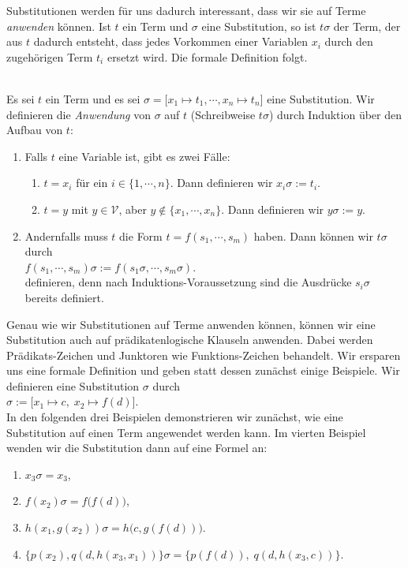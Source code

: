 \noindent
Substitutionen werden f\"{u}r uns dadurch interessant, dass wir sie auf Terme {\emph{\color{blue}anwenden}}
k\"{o}nnen.  Ist $t$ ein Term und  
$\sigma$ eine Substitution, so ist $t\sigma$ der Term, der aus $t$ dadurch entsteht, dass jedes Vorkommen einer Variablen
$x_i$ durch den zugeh\"{o}rigen Term $t_i$ ersetzt wird.  Die formale Definition folgt. 
\begin{Definition}
\hspace*{\fill} \\
Es sei $t$ ein Term und es sei $\sigma = \bigl[ x_1 \mapsto t_1, \cdots, x_n \mapsto t_n \bigr]$
eine Substitution. Wir definieren die \emph{Anwendung} von $\sigma$ auf $t$ (Schreibweise $t\sigma$) durch Induktion \"{u}ber
den Aufbau von $t$: 
\begin{enumerate}
\item Falls $t$ eine Variable ist, gibt es zwei F\"{a}lle:
  \begin{enumerate}
  \item $t = x_i$ f\"{u}r ein $i\in\{1,\cdots,n\}$.  Dann definieren wir \quad  $x_i\sigma := t_i$.
  \item $t = y$ mit $y\in\mathcal{V}$, aber $y \not\in \{x_1,\cdots,x_n\}$. Dann definieren wir \quad $y\sigma := y$.
  \end{enumerate}
\item Andernfalls muss $t$ die Form $t= f(s_1,\cdots,s_m)$ haben. Dann k\"{o}nnen wir $t\sigma$ durch \\[0.2cm]
      \hspace*{1.3cm} $f(s_1, \cdots, s_m)\sigma := f(s_1\sigma, \cdots, s_m\sigma)$. \\[0.2cm]
      definieren, denn nach Induktions-Voraussetzung sind die Ausdr\"{u}cke $s_i\sigma$ bereits definiert.      
      \eox
\end{enumerate}
\end{Definition}

Genau wie wir Substitutionen auf Terme anwenden k\"{o}nnen, k\"{o}nnen wir eine Substitution
auch auf pr\"{a}dikatenlogische Klauseln anwenden.  Dabei werden Pr\"{a}dikats-Zeichen und
Junktoren wie Funktions-Zeichen behandelt.
Wir ersparen uns eine formale Definition und geben statt dessen zun\"{a}chst einige Beispiele. 
Wir definieren eine Substitution $\sigma$ durch \\[0.2cm]
\hspace*{1.3cm} $\sigma := \big[ x_1 \mapsto c,\; x_2 \mapsto f(d) \big]$. \\[0.2cm]
In den folgenden drei Beispielen demonstrieren wir zun\"{a}chst, wie eine Substitution
auf einen Term angewendet werden kann.  Im vierten Beispiel wenden wir die Substitution
dann auf eine Formel an:
\begin{enumerate}
\item $x_3\sigma = x_3$,
\item $f(x_2)\sigma = f\bigl(f(d)\bigr)$,
\item $h(x_1,g(x_2))\sigma = h\bigl(c,g(f(d))\bigr)$.
\item $\bigl\{ p(x_2), q(d,h(x_3,x_1))\bigr\}\sigma = \bigl\{ p(f(d)),\; q(d,h(x_3,c))\bigr\}$.
\end{enumerate}


